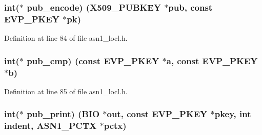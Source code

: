 \subsubsection[{\texorpdfstring{pub\+\_\+encode}{pub_encode}}]{\setlength{\rightskip}{0pt plus 5cm}int($\ast$ pub\+\_\+encode) ({\bf X509\+\_\+\+P\+U\+B\+K\+EY} $\ast$pub, const {\bf E\+V\+P\+\_\+\+P\+K\+EY} $\ast$pk)}\hypertarget{structevp__pkey__asn1__method__st_afb3a83eaa71f6091257cd317119c2a84}{}\label{structevp__pkey__asn1__method__st_afb3a83eaa71f6091257cd317119c2a84}


Definition at line 84 of file asn1\+\_\+locl.\+h.

\subsubsection[{\texorpdfstring{pub\+\_\+cmp}{pub_cmp}}]{\setlength{\rightskip}{0pt plus 5cm}int($\ast$ pub\+\_\+cmp) (const {\bf E\+V\+P\+\_\+\+P\+K\+EY} $\ast${\bf a}, const {\bf E\+V\+P\+\_\+\+P\+K\+EY} $\ast$b)}\hypertarget{structevp__pkey__asn1__method__st_a3d5ce40ba3130bfa4903627a90674fd0}{}\label{structevp__pkey__asn1__method__st_a3d5ce40ba3130bfa4903627a90674fd0}


Definition at line 85 of file asn1\+\_\+locl.\+h.

\subsubsection[{\texorpdfstring{pub\+\_\+print}{pub_print}}]{\setlength{\rightskip}{0pt plus 5cm}int($\ast$ pub\+\_\+print) ({\bf B\+IO} $\ast$out, const {\bf E\+V\+P\+\_\+\+P\+K\+EY} $\ast$pkey, int indent, {\bf A\+S\+N1\+\_\+\+P\+C\+TX} $\ast$pctx)}\hypertarget{structevp__pkey__asn1__method__st_a1ec3f6da35f0cdd500d677123b044d33}{}\label{structevp__pkey__asn1__method__st_a1ec3f6da35f0cdd500d677123b044d33}



